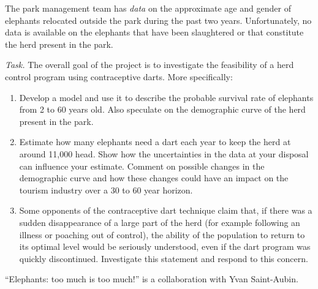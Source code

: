 The park management team has \emph{data} on the approximate age and gender of elephants relocated outside the park during the past two years. 
Unfortunately, no data is available on the elephants that have been slaughtered or that constitute the herd present in the park. 

\emph{Task.} The overall goal of the project is to investigate the feasibility of a herd control program using contraceptive darts. 
More specifically:

\begin{enumerate}[label=\emph{\arabic*.}]
	\item Develop a model and use it to describe the probable survival rate of elephants from 2 to 60 years old. Also speculate on the demographic curve of the herd present in the park.

	\item Estimate how many elephants need a dart each year to keep the herd at around 11,000 head. Show how the uncertainties in the data at your disposal can influence your estimate. Comment on possible changes in the demographic curve and how these changes could have an impact on the tourism industry over a 30 to 60 year horizon.

	\item Some opponents of the contraceptive dart technique claim that, if there was a sudden disappearance of a large part of the herd (for example following an illness or poaching out of control), the ability of the population to return to its optimal level would be seriously understood, even if the dart program was quickly discontinued. Investigate this statement and respond to this concern.

\end{enumerate}



%
%



\vfill

\hfill ``Elephants: too much is too much!'' is a collaboration with Yvan Saint-Aubin.


\begin{noexercises}
\end{noexercises}
